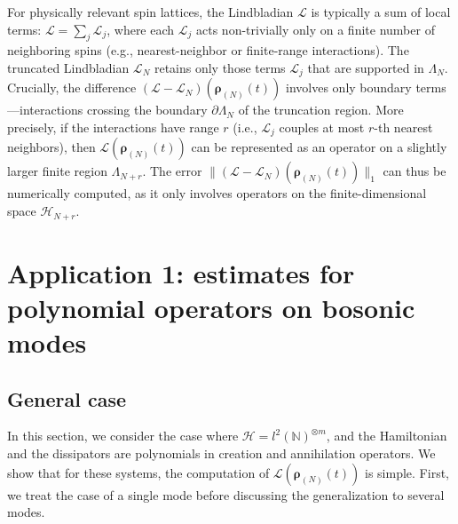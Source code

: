 \documentclass[a4paper,onecolumn,amsmath,amssymb,amsfonts,accepted=2026-03-06]{quantumarticle}
\newcommand{\xL}{\mathcal{L}}
\newcommand{\xH}{\mathcal{H}}
\newcommand{\xN}{\mathbb{N}}
\newcommand{\rN}{{\boldsymbol{\rho}_{(N)}}}
\begin{document}
For physically relevant spin lattices, the Lindbladian $\xL$ is typically a sum of local terms: $\xL = \sum_{j} \xL_j$, where each $\xL_j$ acts non-trivially only on a finite number of neighboring spins (e.g., nearest-neighbor or finite-range interactions). The truncated Lindbladian $\xL_N$ retains only those terms $\xL_j$ that are supported in $\Lambda_N$. Crucially, the difference $(\xL - \xL_N)(\rN(t))$ involves only boundary terms—interactions crossing the boundary $\partial \Lambda_N$ of the truncation region. More precisely, if the interactions have range $r$ (i.e., $\xL_j$ couples at most $r$-th nearest neighbors), then $\xL(\rN(t))$ can be represented as an operator on a slightly larger finite region $\Lambda_{N+r}$. The error $\|(\xL-\xL_N)(\rN(t))\|_1$ can thus be numerically computed, as it only involves operators on the finite-dimensional space $\xH_{N+r}$. 


\section{Application 1: estimates for polynomial operators on bosonic modes}
\label{sec_ex1}
\subsection{General case}
\label{subsec:ap1general_case}
In this section, we consider the case where $\xH=l^2{(\xN)}^{\otimes m}$, and the Hamiltonian and the dissipators are polynomials in creation and annihilation operators. We show that for these systems, the computation of $\xL(\rN(t))$ is simple. First, we treat the case of a single mode before discussing the generalization to several modes.
\end{document}
